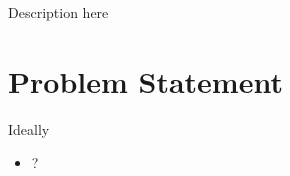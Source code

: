 
Description here




\section{Problem Statement}\label{sec:problem_statement}
Ideally
\begin{itemize}
\item ?
\end{itemize}




